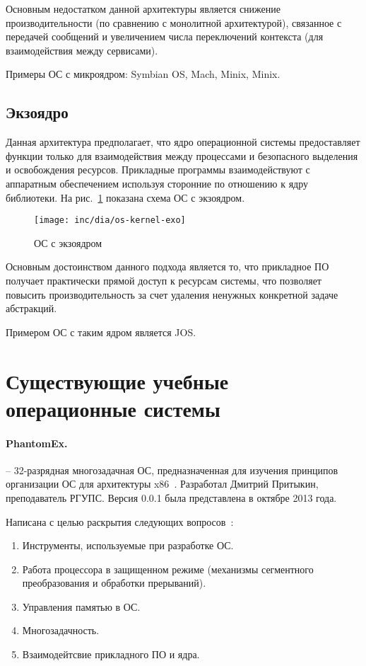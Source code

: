 Основным недостатком данной архитектуры является снижение производительности
(по сравнению с монолитной архитектурой), связанное с передачей сообщений и
увеличением числа переключений контекста (для взаимодействия между сервисами).

Примеры ОС с микроядром: Symbian OS, Mach, Minix, Minix.

\subsection{Экзоядро}
Данная архитектура предполагает, что ядро операционной системы предоставляет
функции только для взаимодействия между процессами и безопасного выделения и
освобождения ресурсов. Прикладные программы взаимодействуют с аппаратным
обеспечением используя сторонние по отношению к ядру библиотеки.
На рис.~\ref{fig:os-kernel-exo} показана схема ОС с экзоядром.

\begin{figure}[ht!]
  \centering
  \texttt{[image: inc/dia/os-kernel-exo]}
  \caption{ОС с экзоядром}
  \label{fig:os-kernel-exo}
\end{figure}

Основным достоинством данного подхода является то, что прикладное ПО получает
практически прямой доступ к ресурсам системы, что позволяет повысить производительность
за счет удаления ненужных конкретной задаче абстракций.

Примером ОС с таким ядром является JOS.

\section{Существующие учебные операционные системы}
\paragraph{PhantomEx.} -- 32-разрядная многозадачная ОС, предназначенная для изучения
принципов организации ОС для архитектуры x86~\cite{phantomex}. Разработал Дмитрий Притыкин,
преподаватель РГУПС. Версия 0.0.1 была представлена в октябре 2013 года.

Написана с целью раскрытия следующих вопросов~\cite{os_dev}:
\begin{enumerate}[1.]
\item Инструменты, используемые при разработке ОС.
\item Работа процессора в защищенном режиме (механизмы сегментного преобразования
	и обработки прерываний).
\item Управления памятью в ОС.
\item Многозадачность.
\item Взаимодейтсвие прикладного ПО и ядра.
\end{enumerate}

